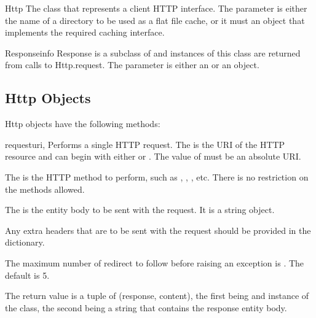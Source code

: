 \begin{classdesc}{Http}{}
The class that represents a client HTTP interface.
The  parameter is either the name of a directory
to be used as a flat file cache, or it must an object that 
implements the required caching interface.
\end{classdesc}

\begin{classdesc}{Response}{info}
Response is a subclass of  and instances of this 
class are returned from calls
to Http.request. The  parameter is either 
an  or an  object.
\end{classdesc}




\subsection{Http Objects}
\label{http-objects}

Http objects have the following methods:

\begin{methoddesc}[Http]{request}{uri, }
Performs a single HTTP request.
The  is the URI of the HTTP resource and can begin with either  or . The value of  must be an absolute URI.

The  is the HTTP method to perform, such as , , , etc. There is no restriction
on the methods allowed.

The  is the entity body to be sent with the request. It is a string
object.

Any extra headers that are to be sent with the request should be provided in the
 dictionary.

The maximum number of redirect to follow before raising an exception is . The default is 5.

The return value is a tuple of (response, content), the first being and instance of the
 class, the second being a string that contains the response entity body.
\end{methoddesc}

